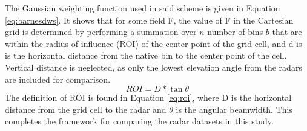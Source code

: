 The Gaussian weighting function used in said scheme is given in Equation \ref{eq:barnesdws}. It shows that for some field F, the value of F in the Cartesian grid is determined by performing a summation over $n$ number of bins $b$ that are within the radius of influence (ROI) of the center point of the grid cell, and d is is the horizontal distance from the native bin to the center point of the cell. Vertical distance is neglected, as only the lowest elevation angle from the radars are included for comparison.
\begin{equation}\label{eq:roi}
ROI = D * \tan{\theta}
\end{equation}
The definition of ROI is found in Equation \ref{eq:roi}, where D is the horizontal distance from the grid cell to the radar and $\theta$ is the angular beamwidth. This completes the framework for comparing the radar datasets in this study.
